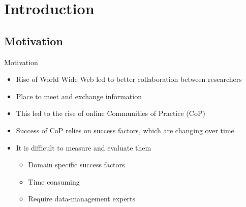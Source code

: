 \section{Introduction}

\subsection{Motivation}

\begin{frame}{Motivation}
  \begin{itemize}
    \item Rise of World Wide Web led to better collaboration between researchers
    \item Place to meet and exchange information
    \item This led to the rise of online Communities of Practice (CoP)
    \item Success of CoP relies on success factors, which are changing over time
    \item It is difficult to measure and evaluate them
          \begin{itemize}
            \item Domain specific success factors
            \item Time consuming
            \item Require data-management experts %
          \end{itemize}
  \end{itemize}
\end{frame}


